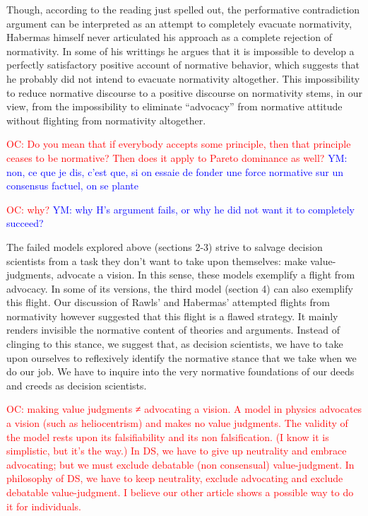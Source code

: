 \documentclass[preprint,11pt]{elsarticle}
\newcommand{\commentYM}[1]{\textcolor{blue}{YM: #1}}
\newcommand{\commentOC}[1]{\textcolor{red}{OC: #1}}
\begin{document}
Though, according to the reading just spelled out, the performative contradiction argument can be interpreted as an attempt to completely evacuate normativity, Habermas himself never articulated his approach as a complete rejection of normativity. In some of his writtings he argues that it is impossible to develop a perfectly satisfactory positive account of normative behavior, which suggests that he probably did not intend to evacuate normativity altogether. This impossibility to reduce normative discourse to a positive discourse on normativity stems, in our view, from the impossibility to eliminate ``advocacy'' from normative attitude without flighting from normativity altogether. 

\commentOC{Do you mean that if everybody
accepts some principle, then that principle ceases to be
normative? Then does it apply to Pareto dominance as well?}
\commentYM{non, ce que je dis, c'est que, si on essaie de fonder une force normative sur un consensus factuel, on se plante}

\commentOC{why?
}
\commentYM{why H's argument fails, or why he did not want it to completely succeed?}

The failed models explored above (sections 2-3) strive to salvage decision scientists from a task they don’t want to take upon themselves: make value-judgments, advocate a vision. In this sense, these models exemplify a flight from advocacy. In some of its versions, the third model (section 4) can also exemplify this flight. Our discussion of Rawls' and Habermas' attempted flights from normativity however suggested that this flight is a flawed strategy. It mainly renders invisible the normative content of theories and arguments. Instead of clinging to this stance, we suggest that, as decision scientists, we have to take upon ourselves to reflexively identify the normative stance that we take when we do our job. We have to inquire into the very normative foundations of our deeds and creeds as decision scientists.

\commentOC{making value judgments ≠
advocating a vision. A model in physics advocates a vision
(such as heliocentrism) and makes no value judgments. The
validity of the model rests upon its falsifiability and its non
falsification. (I know it is simplistic, but it’s the way.)
In DS, we have to give up neutrality and embrace
advocating; but we must exclude debatable (non
consensual) value-judgment.
In philosophy of DS, we have to keep neutrality, exclude
advocating and exclude debatable value-judgment. I believe
our other article shows a possible way to do it for
individuals.}
\end{document}
